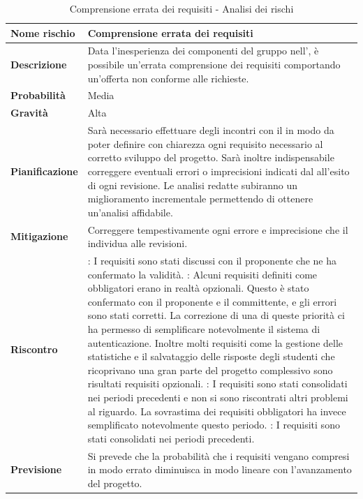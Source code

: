 \documentclass[12pt,a4paper]{article}
\begin{document}
\begin{table}[H]
	\begin{center}
		\begin{tabular}{p{} p{}}
			\toprule
			\textbf{Nome rischio} & \textbf{Comprensione errata dei requisiti} \\
			\midrule
			\midrule
			\textbf{Descrizione} & Data l’inesperienza dei componenti del gruppo nell’\AdR{}, è possibile un’errata comprensione dei requisiti comportando un’offerta non conforme alle richieste. \\
			\midrule
			\textbf{Probabilità} & Media \\
			\midrule
			\textbf{Gravità} & Alta \\
			\midrule
			\textbf{Pianificazione} &  Sarà necessario effettuare degli incontri con il \mgls{proponente} in modo da poter definire con chiarezza ogni requisito necessario al corretto sviluppo del progetto. Sarà inoltre indispensabile correggere eventuali errori o imprecisioni indicati dal \mgls{committente} all’esito di ogni revisione. Le analisi redatte subiranno un miglioramento incrementale permettendo di ottenere un’analisi affidabile. \\
			\midrule
			\textbf{Mitigazione} & Correggere tempestivamente ogni errore e imprecisione che il \mgls{committente} individua alle revisioni. \\
            \midrule
            \textbf{Riscontro} & 
                \textbf{\FA{}}: I requisiti sono stati discussi con il proponente che ne ha confermato la 
                    validità. \newline
                \textbf{\FAD{}}: Alcuni requisiti definiti come obbligatori erano in realtà opzionali.
                    Questo è stato confermato con il proponente e il committente, e gli errori sono stati corretti.
                    La correzione di una di queste priorità ci ha permesso di semplificare notevolmente
                    il sistema di autenticazione. Inoltre molti requisiti come la gestione delle statistiche
                    e il salvataggio delle risposte degli studenti che ricoprivano una gran parte del progetto
                    complessivo sono risultati requisiti opzionali. \newline
                \textbf{\FPA{}}: I requisiti sono stati consolidati nei periodi precedenti e non si sono riscontrati
                    altri problemi al riguardo. La sovrastima dei requisiti obbligatori ha invece semplificato
                    notevolmente questo periodo. \newline
                \textbf{\FPD{}}: I requisiti sono stati consolidati nei periodi precedenti. \\
            \midrule
            \textbf{Previsione} & Si prevede che la probabilità che i requisiti vengano compresi in modo errato
            	diminuisca in modo lineare con l'avanzamento del progetto. \\
			\bottomrule
		\end{tabular}
		\caption{Comprensione errata dei requisiti - Analisi dei rischi}
	\end{center}
\end{table}
\end{document}

